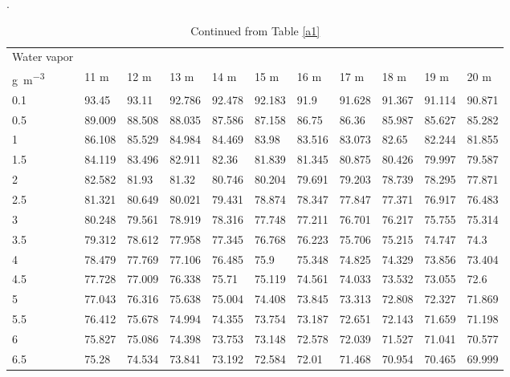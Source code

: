 \begin{bibunit}
\begin{table}[]
\begin{tabular}{lllllllllll}
			\midrule
	\end{tabular}
\end{table}


\begin{table}[]
	\centering
	\scriptsize
	\caption{Continued from Table \ref{a1}}.
	\label{a2}
	\begin{tabular}{lllllllllll}
		\toprule
		Water vapor &&&&&&&&&&\\
	     	\si{\gram\per\meter\cubed}& 11 \si{\meter}     & 12 \si{\meter}     & 13 \si{\meter}     & 14 \si{\meter}     & 15 \si{\meter}     & 16 \si{\meter}     & 17 \si{\meter}     & 18 \si{\meter}     & 19 \si{\meter}     & 20 \si{\meter}     \\
	     	\midrule
			0.1  & 93.45  & 93.11  & 92.786 & 92.478 & 92.183 & 91.9   & 91.628 & 91.367 & 91.114 & 90.871 \\
			0.5  & 89.009 & 88.508 & 88.035 & 87.586 & 87.158 & 86.75  & 86.36  & 85.987 & 85.627 & 85.282 \\
			1    & 86.108 & 85.529 & 84.984 & 84.469 & 83.98  & 83.516 & 83.073 & 82.65  & 82.244 & 81.855 \\
			1.5  & 84.119 & 83.496 & 82.911 & 82.36  & 81.839 & 81.345 & 80.875 & 80.426 & 79.997 & 79.587 \\
			2    & 82.582 & 81.93  & 81.32  & 80.746 & 80.204 & 79.691 & 79.203 & 78.739 & 78.295 & 77.871 \\
			2.5  & 81.321 & 80.649 & 80.021 & 79.431 & 78.874 & 78.347 & 77.847 & 77.371 & 76.917 & 76.483 \\
			3    & 80.248 & 79.561 & 78.919 & 78.316 & 77.748 & 77.211 & 76.701 & 76.217 & 75.755 & 75.314 \\
			3.5  & 79.312 & 78.612 & 77.958 & 77.345 & 76.768 & 76.223 & 75.706 & 75.215 & 74.747 & 74.3   \\
			4    & 78.479 & 77.769 & 77.106 & 76.485 & 75.9   & 75.348 & 74.825 & 74.329 & 73.856 & 73.404 \\
			4.5  & 77.728 & 77.009 & 76.338 & 75.71  & 75.119 & 74.561 & 74.033 & 73.532 & 73.055 & 72.6   \\
			5    & 77.043 & 76.316 & 75.638 & 75.004 & 74.408 & 73.845 & 73.313 & 72.808 & 72.327 & 71.869 \\
			5.5  & 76.412 & 75.678 & 74.994 & 74.355 & 73.754 & 73.187 & 72.651 & 72.143 & 71.659 & 71.198 \\
			6    & 75.827 & 75.086 & 74.398 & 73.753 & 73.148 & 72.578 & 72.039 & 71.527 & 71.041 & 70.577 \\
			6.5  & 75.28  & 74.534 & 73.841 & 73.192 & 72.584 & 72.01  & 71.468 & 70.954 & 70.465 & 69.999 \\

\end{tabular}
\end{table}
\end{bibunit}
